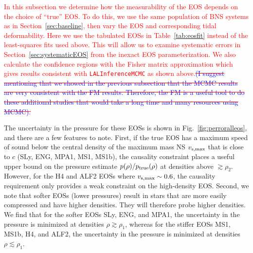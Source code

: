 \documentclass[twocolumn,prd,amssymb,aps,nofootinbib,showpacs,epsf]{revtex4}
\newcommand\ben[2]{\textcolor{red}{{#1}\sout{#2}}}
\newcommand\les[2]{\textcolor{blue}{{#1}\sout{#2}}}
\begin{document}
\ben{In this subsection we determine how the measurability of the EOS depends on the choice of ``true'' EOS. To do this, we use the same population of BNS systems as in Section~\ref{sec:baseline}, then vary the EOS and corresponding tidal deformability. Here we use the tabulated EOSs in Table~\ref{tab:eosfit} instead of the least-squares fits used above. This will allow us to examine systematic errors in Section~\ref{sec:systematicEOS} from the inexact EOS parameterization. We also calculate the confidence regions with the Fisher matrix approximation which gives results consistent with \texttt{LALInferenceMCMC} as shown above.}{\les{(I suggest mentioning that we showed in the previous subsection that the MCMC results are very consistent with the FM results.  Therefore, the FM is a useful tool to do these additional studies that would take a long time and many resources using MCMC)}{}.} 

The uncertainty in the pressure for these EOSs is shown in Fig.~\ref{fig:perroralleos}, and there are a few features to note. First, if the true EOS has a maximum speed of sound below the central density of the maximum mass NS $v_{\rm s, max}$ that is close to $c$ (SLy, ENG, MPA1, MS1, MS1b), the causality constraint places a useful upper bound on the pressure estimate $p(\rho)/p_{\rm true}(\rho)$ at densities above $\gtrsim \rho_2$. However, for the H4 and ALF2 EOSs where $v_{\rm s, max} \sim 0.6$, the causality requirement only provides a weak constraint on the high-density EOS. Second, we note that softer EOSs (lower pressures) result in stars that are more easily compressed and have higher densities. They will therefore probe higher densities. We find that for the softer EOSs SLy, ENG, and MPA1, the uncertainty in the pressure is minimized at densities $\rho \gtrsim \rho_1$, whereas for the stiffer EOSs MS1, MS1b, H4, and ALF2, the uncertainty in the pressure is minimized at densities $\rho \lesssim \rho_1$.
\end{document}
